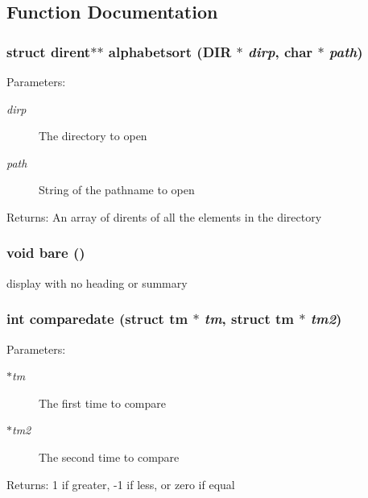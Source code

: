 \subsection{Function Documentation}
\subsubsection{\setlength{\rightskip}{0pt plus 5cm}struct dirent$\ast$$\ast$ alphabetsort (DIR $\ast$ {\em dirp}, char $\ast$ {\em path})}\label{dir_8h_2684b144ccffca43c2bd84d19795f700}


\begin{Desc}
\item[Parameters:]
\begin{description}
\item[{\em dirp}]The directory to open \item[{\em path}]String of the pathname to open \end{description}
\end{Desc}
\begin{Desc}
\item[Returns:]An array of dirents of all the elements in the directory \end{Desc}
\subsubsection{\setlength{\rightskip}{0pt plus 5cm}void bare ()}\label{dir_8h_d4957954133b9e627d0b769ea5851a4b}


display with no heading or summary 
\subsubsection{\setlength{\rightskip}{0pt plus 5cm}int comparedate (struct tm $\ast$ {\em tm}, struct tm $\ast$ {\em tm2})}\label{dir_8h_e080fb0b0c9f9f1b39792d9c03f7ad11}


\begin{Desc}
\item[Parameters:]
\begin{description}
\item[{\em $\ast$tm}]The first time to compare \item[{\em $\ast$tm2}]The second time to compare \end{description}
\end{Desc}
\begin{Desc}
\item[Returns:]1 if greater, -1 if less, or zero if equal \end{Desc}
